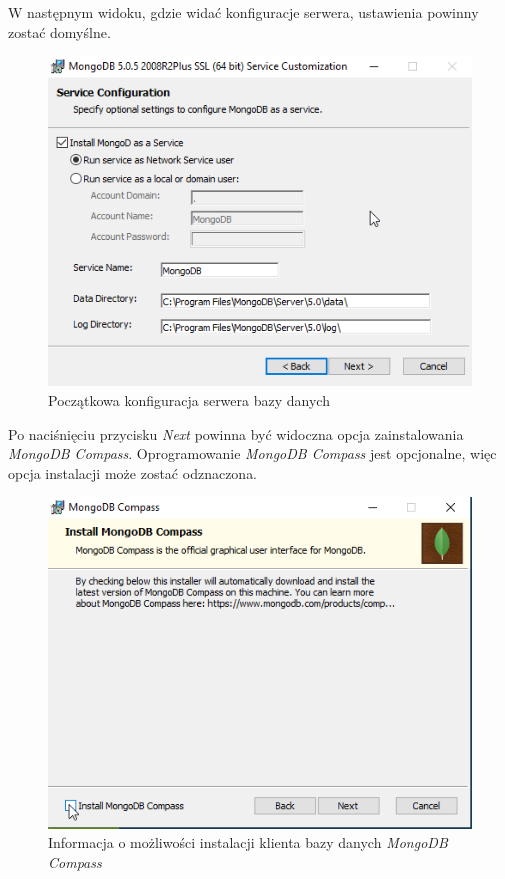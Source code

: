 \documentclass[a4paper,twoside,12pt]{book}
\begin{document}
W następnym widoku, gdzie widać konfiguracje serwera, ustawienia powinny zostać domyślne.
\FloatBarrier
\begin{figure}[H]
	\centering
	\includegraphics[width=0.7\linewidth]{../zrzuty_ekranu/instalcja_mongodb/mongodb4}
	\caption{Początkowa konfiguracja serwera bazy danych}
	\label{fig:mongodb4}
\end{figure}
\afterpage{\clearpage}
\FloatBarrier

Po naciśnięciu przycisku \textit{Next} powinna być widoczna opcja zainstalowania \textit{MongoDB Compass}. Oprogramowanie \textit{MongoDB Compass} jest opcjonalne, więc opcja instalacji może zostać odznaczona.
\FloatBarrier
\begin{figure}[H]
	\centering
	\includegraphics[width=0.7\linewidth]{../zrzuty_ekranu/instalcja_mongodb/mogndodb5}
	\caption{Informacja o możliwości instalacji klienta bazy danych \textit{MongoDB Compass}}
	\label{fig:mogndodb5}
\end{figure}
\afterpage{\clearpage}
\FloatBarrier
\end{document}
